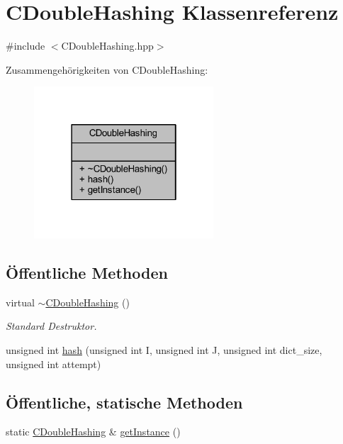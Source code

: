\hypertarget{class_c_double_hashing}{}\section{C\+Double\+Hashing Klassenreferenz}
\label{class_c_double_hashing}


{\ttfamily \#include $<$C\+Double\+Hashing.\+hpp$>$}



Zusammengehörigkeiten von C\+Double\+Hashing\+:
\nopagebreak
\begin{figure}[H]
\begin{center}
\leavevmode
\includegraphics[width=190pt]{class_c_double_hashing__coll__graph}
\end{center}
\end{figure}
\subsection*{Öffentliche Methoden}
\begin{DoxyCompactItemize}
\item 
virtual \hyperlink{class_c_double_hashing_a4ffc5039f507c1def31ca5bc672ce8e2}{$\sim$\+C\+Double\+Hashing} ()
\begin{DoxyCompactList}\small\item\em Standard Destruktor. \end{DoxyCompactList}\item 
unsigned int \hyperlink{class_c_double_hashing_a0ec6ff1eb94927284b8e6fe4f650ecf9}{hash} (unsigned int I, unsigned int J, unsigned int dict\+\_\+size, unsigned int attempt)
\end{DoxyCompactItemize}
\subsection*{Öffentliche, statische Methoden}
\begin{DoxyCompactItemize}
\item 
static \hyperlink{class_c_double_hashing}{C\+Double\+Hashing} \& \hyperlink{class_c_double_hashing_a3917e940f9bac5c981156062eb2b1169}{get\+Instance} ()
\end{DoxyCompactItemize}


